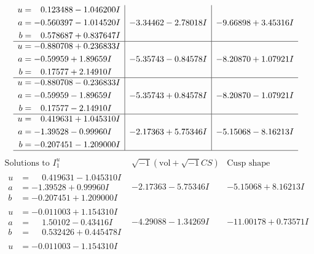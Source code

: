 \documentclass[1p]{elsarticle_modified}
\theoremstyle{definition}
\newcommand{\I}{\sqrt{-1}}
\begin{document}
$$\begin{array}{c|c|c}
\begin{aligned}
u &= \phantom{-}0.123488 - 1.046200 I \\
a &= -0.560397 - 1.014520 I \\
b &= \phantom{-}0.578687 + 0.837647 I\end{aligned}
 & -3.34462 - 2.78018 I & -9.66898 + 3.45316 I \\ \hline\begin{aligned}
u &= -0.880708 + 0.236833 I \\
a &= -0.59959 + 1.89659 I \\
b &= \phantom{-}0.17577 + 2.14910 I\end{aligned}
 & -5.35743 - 0.84578 I & -8.20870 + 1.07921 I \\ \hline\begin{aligned}
u &= -0.880708 - 0.236833 I \\
a &= -0.59959 - 1.89659 I \\
b &= \phantom{-}0.17577 - 2.14910 I\end{aligned}
 & -5.35743 + 0.84578 I & -8.20870 - 1.07921 I \\ \hline\begin{aligned}
u &= \phantom{-}0.419631 + 1.045310 I \\
a &= -1.39528 - 0.99960 I \\
b &= -0.207451 - 1.209000 I\end{aligned}
 & -2.17363 + 5.75346 I & -5.15068 - 8.16213 I\\
 \hline 
 \end{array}$$\newpage$$\begin{array}{c|c|c}  
\text{Solutions to }I^u_{1}& \I (\text{vol} + \sqrt{-1}CS) & \text{Cusp shape}\\
 \hline 
\begin{aligned}
u &= \phantom{-}0.419631 - 1.045310 I \\
a &= -1.39528 + 0.99960 I \\
b &= -0.207451 + 1.209000 I\end{aligned}
 & -2.17363 - 5.75346 I & -5.15068 + 8.16213 I \\ \hline\begin{aligned}
u &= -0.011003 + 1.154310 I \\
a &= \phantom{-}1.50102 - 0.43416 I \\
b &= \phantom{-}0.532426 + 0.445478 I\end{aligned}
 & -4.29088 - 1.34269 I & -11.00178 + 0.73571 I \\ \hline\begin{aligned}
u &= -0.011003 - 1.154310 I \\

\end{aligned}
\end{array}$$
\end{document}
